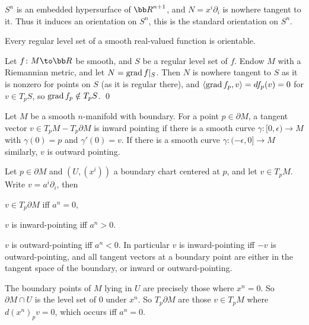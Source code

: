 \eproof

\bexam

    $S^n$ is an embedded hypersurface of $\bR^{n+1}$, and $N=x^i\partial_i$ is nowhere tangent to it.
    Thus it induces an orientation on $S^n$, this is the {\emphcolor standard orientation} on $S^n$.

\eexam

\bcoro

    Every regular level set of a smooth real-valued function is orientable.

\ecoro

\bproof

    Let $f\colon M\to\bR$ be smooth, and $S$ be a regular level set of $f$.
    Endow $M$ with a Riemannian metric, and let $N=\mathop{\rm grad}\nolimits f|_S$.
    Then $N$ is nowhere tangent to $S$ as it is nonzero for points on $S$ (as it is regular there), and
    $\mathopen{}\mathclose{\left<\mathop{\rm grad}\nolimits f_p,v\right>}=df_p(v)=0$ for $v\in T_pS$, so $\mathop{\rm grad}\nolimits f_p\notin T_pS$.
    \qed

\eproof

\bdefn

    Let $M$ be a smooth $n$-manifold with boundary.
    For a point $p\in\partial M$, a tangent vector $v\in T_pM-T_p\partial M$ is {\emphcolor inward pointing}
    if there is a smooth curve $\gamma\colon[0,\epsilon)\to M$ with $\gamma(0)=p$ and $\gamma'(0)=v$.
    If there is a smooth curve $\gamma\colon(-\epsilon,0]\to M$ similarly, $v$ is {\emphcolor outward pointing}.

\edefn

\bprop

    Let $p\in\partial M$ and $(U,(x^i))$ a boundary chart centered at $p$, and let $v\in T_pM$.
    Write $v=a^i\partial_i$, then
    \benum
        \item $v\in T_p\partial M$ iff $a^n=0$,
        \item $v$ is inward-pointing iff $a^n>0$.
        \item $v$ is outward-pointing iff $a^n<0$.
    \eenum
    In particular $v$ is inward-pointing iff $-v$ is outward-pointing, and all tangent vectors at a boundary point are either
    in the tangent space of the boundary, or inward or outward-pointing.

\eprop

\bproof

    The boundary points of $M$ lying in $U$ are precisely those where $x^n=0$.
    So $\partial M\cap U$ is the level set of $0$ under $x^n$.
    So $T_p\partial M$ are those $v\in T_pM$ where $d(x^n)_pv=0$, which occurs iff $a^n=0$.

